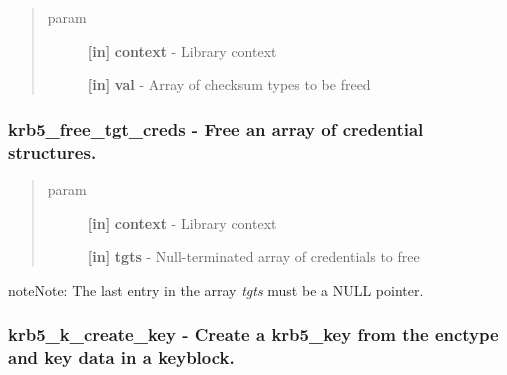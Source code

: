 \documentclass[letterpaper,10pt,english]{sphinxmanual}
\begin{document}
\begin{quote}\begin{description}
\item[{param}] \leavevmode
\textbf{{[}in{]}} \textbf{context} - Library context

\textbf{{[}in{]}} \textbf{val} - Array of checksum types to be freed

\end{description}\end{quote}


\subsubsection{krb5\_free\_tgt\_creds -  Free an array of credential structures.}
\label{appdev/refs/api/krb5_free_tgt_creds::doc}\label{appdev/refs/api/krb5_free_tgt_creds:krb5-free-tgt-creds-free-an-array-of-credential-structures}

\begin{fulllineitems}
\label{appdev/refs/api/krb5_free_tgt_creds:c.krb5_free_tgt_creds}
\end{fulllineitems}

\begin{quote}\begin{description}
\item[{param}] \leavevmode
\textbf{{[}in{]}} \textbf{context} - Library context

\textbf{{[}in{]}} \textbf{tgts} - Null-terminated array of credentials to free

\end{description}\end{quote}

\begin{notice}{note}{Note:}
The last entry in the array \emph{tgts} must be a NULL pointer.
\end{notice}


\subsubsection{krb5\_k\_create\_key -  Create a krb5\_key from the enctype and key data in a keyblock.}
\label{appdev/refs/api/krb5_k_create_key::doc}\label{appdev/refs/api/krb5_k_create_key:krb5-k-create-key-create-a-krb5-key-from-the-enctype-and-key-data-in-a-keyblock}
\end{document}

